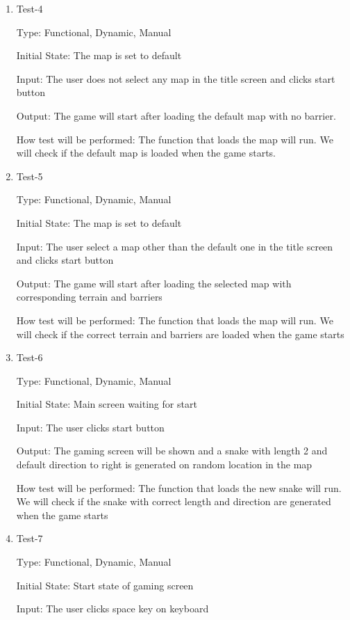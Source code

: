 \documentclass[12pt, titlepage]{article}
\begin{document}
\begin{enumerate}
\item{Test-4\\}

Type: Functional, Dynamic, Manual

Initial State: The map is set to default

Input: The user does not select any map in the title screen and clicks start button

Output: The game will start after loading the default map with no barrier.

How test will be performed: The function that loads the map will run. We will check if the default map is loaded when the game starts.

\item{Test-5\\}

Type: Functional, Dynamic, Manual

Initial State: The map is set to default

Input: The user select a map other than the default one in the title screen and clicks start button

Output: The game will start after loading the selected map with corresponding terrain and barriers

How test will be performed: The function that loads the map will run. We will check if the correct terrain and barriers are loaded when the game starts

\item{Test-6\\}

Type: Functional, Dynamic, Manual

Initial State: Main screen waiting for start

Input: The user clicks start button

Output: The gaming screen will be shown and a snake with length 2 and default direction to right is generated on random location in the map

How test will be performed: The function that loads the new snake will run. We will check if the snake with correct length and direction are generated when the game starts

\item{Test-7\\}

Type: Functional, Dynamic, Manual

Initial State: Start state of gaming screen

Input: The user clicks space key on keyboard


\end{enumerate}
\end{document}
